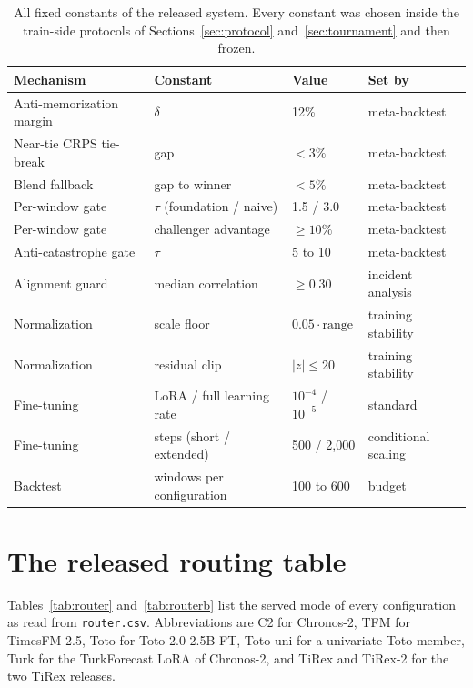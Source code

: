 \documentclass[11pt]{article}
\newcommand{\code}[1]{\texttt{#1}}
\begin{document}
\begin{table}[ht]
\centering
\footnotesize
\begin{tabular}{llll}
\toprule
Mechanism & Constant & Value & Set by \\
\midrule
Anti-memorization margin & $\delta$ & 12\% & meta-backtest \\
Near-tie CRPS tie-break & gap & $<3\%$ & meta-backtest \\
Blend fallback & gap to winner & $<5\%$ & meta-backtest \\
Per-window gate & $\tau$ (foundation / naive) & 1.5 / 3.0 & meta-backtest \\
Per-window gate & challenger advantage & $\ge 10\%$ & meta-backtest \\
Anti-catastrophe gate & $\tau$ & 5 to 10 & meta-backtest \\
Alignment guard & median correlation & $\ge 0.30$ & incident analysis \\
Normalization & scale floor & $0.05\cdot\mathrm{range}$ & training stability \\
Normalization & residual clip & $|z|\le 20$ & training stability \\
Fine-tuning & LoRA / full learning rate & $10^{-4}$ / $10^{-5}$ & standard \\
Fine-tuning & steps (short / extended) & 500 / 2{,}000 & conditional scaling \\
Backtest & windows per configuration & 100 to 600 & budget \\
\bottomrule
\end{tabular}
\caption{All fixed constants of the released system. Every constant was
chosen inside the train-side protocols of Sections~\ref{sec:protocol}
and~\ref{sec:tournament} and then frozen.}
\label{tab:constants}
\end{table}

\section{The released routing table}
\label{app:router}

Tables~\ref{tab:router} and~\ref{tab:routerb} list the served mode of
every configuration as read from \code{router.csv}. Abbreviations are C2 for Chronos-2, TFM for
TimesFM 2.5, Toto for Toto 2.0 2.5B FT, Toto-uni for a univariate Toto member, Turk for the TurkForecast LoRA of Chronos-2, and TiRex and
TiRex-2 for the two TiRex releases.
\end{document}
